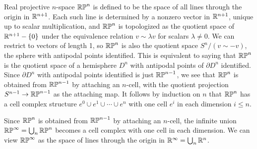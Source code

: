 \begin{example}
\label{ex:real-projective-space-cw}
Real projective $n$-space $\mathbb{RP}^n$ is defined to be the space of all lines through the
origin in $\mathbb{R}^{n+1}$. Each such line is determined by a nonzero vector in $\mathbb{R}^{n+1}$, unique
up to scalar multiplication, and $\mathbb{RP}^n$ is topologized as the quotient space of
$\mathbb{R}^{n+1} - \{0\}$ under the equivalence relation $v \sim \lambda v$ for scalars $\lambda \ne 0$. We can
restrict to vectors of length 1, so $\mathbb{RP}^n$ is also the quotient space $S^n / (v \sim -v)$, the
sphere with antipodal points identified. This is equivalent to saying that $\mathbb{RP}^n$ is the
quotient space of a hemisphere $D^n$ with antipodal points of $\partial D^n$ identified. Since
$\partial D^n$ with antipodal points identified is just $\mathbb{RP}^{n-1}$, we see that $\mathbb{RP}^n$ is obtained
from $\mathbb{RP}^{n-1}$ by attaching an $n$-cell, with the quotient projection $S^{n-1} \to \mathbb{RP}^{n-1}$ as
the attaching map. It follows by induction on $n$ that $\mathbb{RP}^n$ has a cell complex structure
$e^0 \cup e^1 \cup \cdots \cup e^n$ with one cell $e^i$ in each dimension $i \le n$.
\end{example}

\begin{example}
\label{ex:infinite-real-projective-space}
Since $\mathbb{RP}^n$ is obtained from $\mathbb{RP}^{n-1}$ by attaching an $n$-cell, the infinite union
$\mathbb{RP}^\infty = \bigcup_n \mathbb{RP}^n$ becomes a cell complex with one cell in each dimension. We can
view $\mathbb{RP}^\infty$ as the space of lines through the origin in $\mathbb{R}^\infty = \bigcup_n \mathbb{R}^n$.
\end{example}

